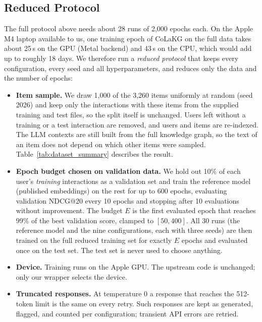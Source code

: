 \documentclass[a4paper,11pt]{article}
\begin{document}
\subsection{Reduced Protocol}
\label{sec:reduced}
The full protocol above needs about 28 runs of 2,000 epochs each. On the Apple M4 laptop available to us, one training epoch of CoLaKG on the full data takes about 25\,s on the GPU (Metal backend) and 43\,s on the CPU, which would add up to roughly 18 days. We therefore run a \emph{reduced protocol} that keeps every configuration, every seed and all hyperparameters, and reduces only the data and the number of epochs:
\begin{itemize}
    \item \textbf{Item sample.} We draw 1,000 of the 3,260 items uniformly at random (seed 2026) and keep only the interactions with these items from the supplied training and test files, so the split itself is unchanged. Users left without a training or a test interaction are removed, and users and items are re-indexed. The LLM contexts are still built from the full knowledge graph, so the text of an item does not depend on which other items were sampled. Table~\ref{tab:dataset_summary} describes the result.
    \item \textbf{Epoch budget chosen on validation data.} We hold out 10\% of each user's \emph{training} interactions as a validation set and train the reference model (published embeddings) on the rest for up to 600 epochs, evaluating validation NDCG@20 every 10 epochs and stopping after 10 evaluations without improvement. The budget $E$ is the first evaluated epoch that reaches 99\% of the best validation score, clamped to $[50,400]$. All 30 runs (the reference model and the nine configurations, each with three seeds) are then trained on the full reduced training set for exactly $E$ epochs and evaluated once on the test set. The test set is never used to choose anything.
    \item \textbf{Device.} Training runs on the Apple GPU. The upstream code is unchanged; only our wrapper selects the device.
    \item \textbf{Truncated responses.} At temperature 0 a response that reaches the 512-token limit is the same on every retry. Such responses are kept as generated, flagged, and counted per configuration; transient API errors are retried.
\end{itemize}
\end{document}
